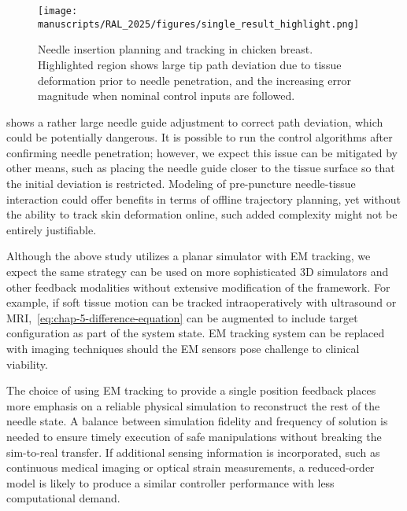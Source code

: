 
\begin{figure}[h]
  \centering
  \texttt{[image: manuscripts/RAL\_2025/figures/single\_result\_highlight.png]}
  \caption{Needle insertion planning and tracking in chicken breast. Highlighted region shows large tip path deviation due to tissue deformation prior to needle penetration, and the increasing error magnitude when nominal control inputs are followed.}
  \label{fig:chap-5-single-result}
\end{figure}


 shows a rather large needle guide adjustment to correct path deviation, which could be potentially dangerous. It is possible to run the control algorithms after confirming needle penetration; however, we expect this issue can be mitigated by other means, such as placing the needle guide closer to the tissue surface so that the initial deviation is restricted. Modeling of pre-puncture needle-tissue interaction could offer benefits in terms of offline trajectory planning, yet without the ability to track skin deformation online, such added complexity might not be entirely justifiable. 

Although the above study utilizes a planar simulator with EM tracking, we expect the same strategy can be used on more sophisticated 3D simulators and other feedback modalities without extensive modification of the framework. For example, if soft tissue motion can be tracked intraoperatively with ultrasound or MRI,~\cref{eq:chap-5-difference-equation} can be augmented to include target configuration as part of the system state. EM tracking system can be replaced with imaging techniques should the EM sensors pose challenge to clinical viability. 

The choice of using EM tracking to provide a single position feedback places more emphasis on a reliable physical simulation to reconstruct the rest of the needle state. A balance between simulation fidelity and frequency of solution is needed to ensure timely execution of safe manipulations without breaking the sim-to-real transfer. If additional sensing information is incorporated, such as continuous medical imaging or optical strain measurements, a reduced-order model is likely to produce a similar controller performance with less computational demand.

